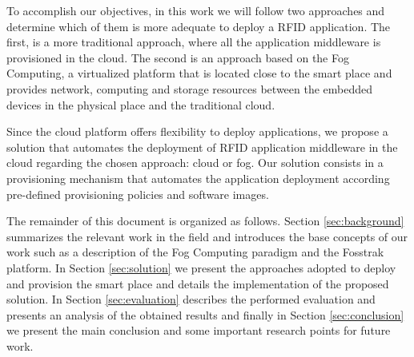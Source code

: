To accomplish our objectives, in this work we will follow two approaches and determine which of them
is more adequate to deploy a \gls{RFID} application. The first, is a more traditional approach, where
all the application middleware is provisioned in the cloud. The second is an approach based on the Fog
Computing\cite{bonomi2012fog}, a virtualized platform that is located close to the smart place and
provides network, computing and storage resources between the embedded devices in the physical place
and the traditional cloud.

Since the cloud platform offers flexibility to deploy applications, we propose a solution that
automates the deployment of \gls{RFID} application middleware in the cloud regarding the chosen approach:
cloud or fog. Our solution consists in a provisioning mechanism that automates the application
deployment according pre-defined provisioning policies and software images.

The remainder of this document is organized as follows. Section \ref{sec:background} summarizes the
relevant work in the field and introduces the base concepts of our work such as a description of the
Fog Computing paradigm and the Fosstrak platform. In Section \ref{sec:solution} we present the
approaches adopted to deploy and provision the smart place and details the implementation
of the proposed solution. In Section \ref{sec:evaluation} describes the performed evaluation and
presents an analysis of the obtained results and finally in Section \ref{sec:conclusion} we present
the main conclusion and some important research points for future work.
